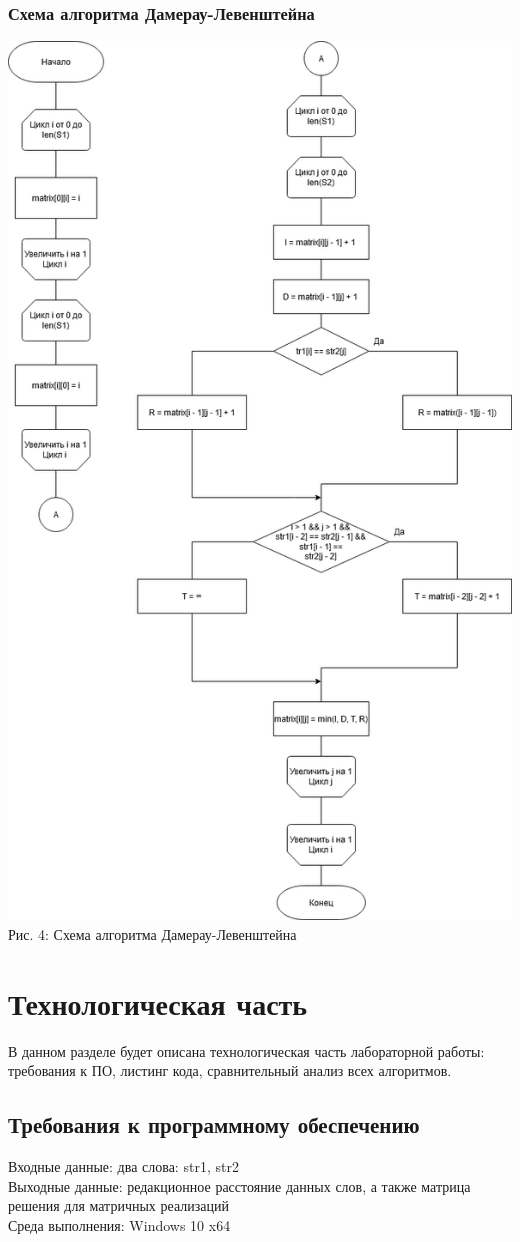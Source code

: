 \documentclass[12pt,a4paper]{article}
\begin{document}
\subsubsection{Схема алгоритма Дамерау-Левенштейна}
\begin{center}
	\includegraphics[width=.67\linewidth]{dam_lev}\\
	Рис. 4: Схема алгоритма Дамерау-Левенштейна
\end{center}
\clearpage

\section{Технологическая часть}
В данном разделе будет описана технологическая часть лабораторной работы: требования к ПО, листинг кода, сравнительный анализ всех алгоритмов.
\subsection{Требования к программному обеспечению}
Входные данные: два слова: str1, str2\\
Выходные данные: редакционное расстояние данных слов, а также матрица решения для матричных реализаций\\
Среда выполнения: Windows 10 x64
\end{document}
